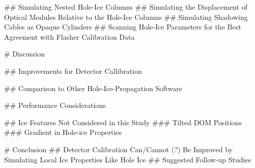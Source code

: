 
## Simulating Nested Hole-Ice Columns
## Simulating the Displacement of Optical Modules Relative to the Hole-Ice Columns
## Simulating Shadowing Cables as Opaque Cylinders
## Scanning Hole-Ice Parameters for the Best Agreement with Flasher Calibration Data

# Discussion

## Improvements for Detector Callibration

## Comparison to Other Hole-Ice-Propagation Software

## Performance Considerations

## Ice Features Not Considered in this Study
### Tilted DOM Positions
### Gradient in Hole-ice Properties

# Conclusion
## Detector Calibration Can/Cannot (?) Be Improved by Simulating Local Ice Properties Like Hole Ice
## Suggested Follow-up Studies

